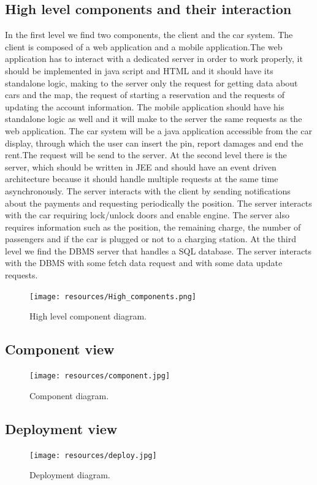 \subsection{High level components and their interaction}
In the first level we find two components, the client and the car system. The client is composed of a web application and a mobile application.The web application has to interact with a dedicated server in order to work properly, it should be implemented in java script and HTML and it should have its standalone logic, making to the server only the request for getting data about cars and the map, the request of starting a reservation and the requests of updating the account information. The mobile application should have his standalone logic as well and it will make to the server the same requests as the web application. The car system will be a java application accessible from the car display, through which the user can insert the pin, report damages and end the rent.The request will be send to the server. 
At the second level there is the server, which should be written in JEE and should have an event driven architecture because it should handle multiple requests at the same time asynchronously. The server interacts with the client by sending notifications about the payments and requesting periodically the position. The server interacts with the car requiring lock/unlock doors and enable engine. The server also requires information such as the position, the remaining charge, the number of passengers and if the car is plugged or not to a charging station.  
At the third level we find the DBMS server that handles a SQL database.
The server interacts with the DBMS with some fetch data request and with some data update requests.
\\

\begin{figure}[hp]
\centering
\texttt{[image: resources/High\_components.png]}
\caption{\label{fig:high_component}High level component diagram.}
\end{figure}


\newpage
\subsection{Component view}
\begin{figure}[hp]
\centering
\texttt{[image: resources/component.jpg]}
\caption{\label{fig:component}Component diagram.}
\end{figure}

\newpage
\subsection{Deployment view}
\begin{figure}[hp]
\centering
\texttt{[image: resources/deploy.jpg]}
\caption{\label{fig:deploy}Deployment diagram.}
\end{figure}


